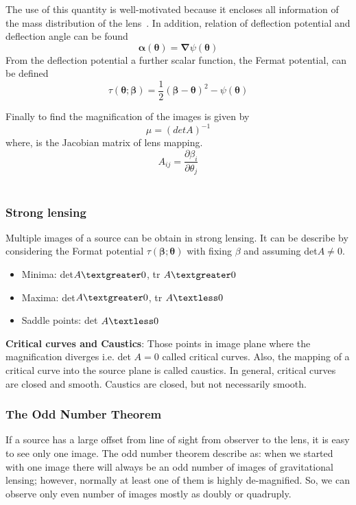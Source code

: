 The use of this quantity is well-motivated because it encloses all information of the mass distribution of the lens~\cite{manual}. In addition, relation of deflection potential and deflection angle can be found
\begin{equation}
\pmb\alpha(\pmb\theta)=\pmb\nabla\psi(\pmb\theta)
\label{Equ:AlphaTheta}
\end{equation}
From the deflection potential a further scalar function, the Fermat potential, can be defined
\begin{equation}
\tau(\pmb\theta; \pmb\beta)=\frac{1}{2}(\pmb\beta -\pmb\theta)^2 -\psi(\pmb\theta)
\label{Equ:Format}
\end{equation}

Finally to find the magnification of the images is given by
\begin{equation}
\mu =(det A)^{-1}
\end{equation}
where,  is the Jacobian matrix of lens mapping.
\begin{equation}
A_{ij}=\frac{\partial\beta_{i}}{\partial \theta_{j}}
\end{equation}\\

\subsubsection{Strong lensing}
Multiple images of a source can be obtain in strong lensing. It can be  describe by considering the Format potential $\tau(\pmb\beta;\pmb\theta) $ with fixing $\beta$ and assuming det$ A \ne 0$.

\begin{itemize}
	\item Minima: det$ A\textgreater 0$, tr $A\textgreater 0$
	\item Maxima: det$ A\textgreater 0$, tr $A\textless 0$
	\item Saddle points: det $A\textless 0$
\end{itemize}
\noindent
\textbf{Critical curves and Caustics}: Those points in image plane where the magnification diverges i.e. det $A=0  $ called critical curves. Also, the mapping of a critical curve into the source plane is called caustics. In general, critical curves are closed and smooth. Caustics are closed, but not necessarily smooth.

\subsubsection{The Odd Number Theorem}
If a source has a large offset from line of sight from observer to the lens, it is easy to see only one image. The odd number theorem describe as: when we started with one image there will always be an odd number of images of gravitational lensing; however, normally at least one of them is highly de-magnified. So, we can observe only even number of images mostly as doubly or quadruply.


